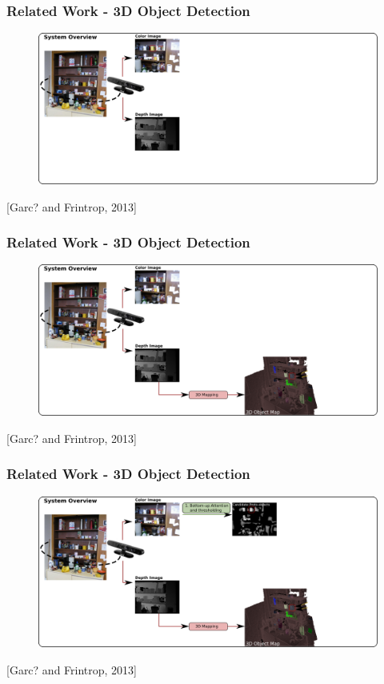 \documentclass[t]{beamer} %
\begin{document}
\begin{frame}
	\frametitle{ Related Work - 3D Object Detection }
	\begin{figure}[h]
		\includegraphics[width=1\textwidth]{src/frintrop1.png}
	\end{figure}
	\centering
	\scriptsize [Garc? and Frintrop, 2013]
\end{frame}

\begin{frame}
	\frametitle{ Related Work - 3D Object Detection }
	\begin{figure}[h]
		\includegraphics[width=1\textwidth]{src/frintrop2.png}
	\end{figure}
	\centering
	\scriptsize [Garc? and Frintrop, 2013]
\end{frame}

\begin{frame}
	\frametitle{ Related Work - 3D Object Detection }
	\begin{figure}[h]
		\includegraphics[width=1\textwidth]{src/frintrop3.png}
	\end{figure}
	\centering
	\scriptsize [Garc? and Frintrop, 2013]
\end{frame}
\end{document}
